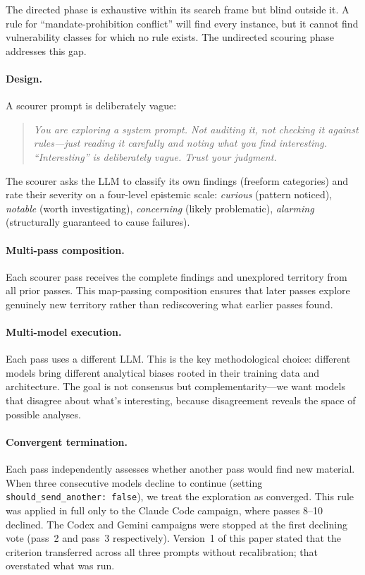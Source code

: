 \documentclass[11pt,a4paper]{article}
\begin{document}
The directed phase is exhaustive within its search frame but blind
outside it. A rule for ``mandate-prohibition conflict'' will find every
instance, but it cannot find vulnerability classes for which no rule
exists. The undirected scouring phase addresses this gap.

\paragraph{Design.} A scourer prompt is deliberately vague:

\begin{quote}
\itshape
You are exploring a system prompt. Not auditing it, not checking it
against rules---just reading it carefully and noting what you find
interesting. ``Interesting'' is deliberately vague. Trust your judgment.
\end{quote}

The scourer asks the LLM to classify its own findings (freeform
categories) and rate their severity on a four-level epistemic scale:
\emph{curious} (pattern noticed), \emph{notable} (worth
investigating), \emph{concerning} (likely problematic), \emph{alarming}
(structurally guaranteed to cause failures).

\paragraph{Multi-pass composition.} Each scourer pass receives the
complete findings and unexplored territory from all prior passes. This
map-passing composition ensures that later passes explore genuinely new
territory rather than rediscovering what earlier passes found.

\paragraph{Multi-model execution.} Each pass uses a different LLM.
This is the key methodological choice: different models bring different
analytical biases rooted in their training data and architecture. The
goal is not consensus but complementarity---we want models that
disagree about what's interesting, because disagreement reveals the
space of possible analyses.

\paragraph{Convergent termination.} Each pass independently assesses
whether another pass would find new material. When three consecutive
models decline to continue (setting \texttt{should\_send\_another:
false}), we treat the exploration as converged. This rule was applied
in full only to the Claude Code campaign, where passes 8--10 declined.
The Codex and Gemini campaigns were stopped at the first declining vote
(pass~2 and pass~3 respectively). Version~1 of this paper stated that
the criterion transferred across all three prompts without
recalibration; that overstated what was run.
\end{document}
